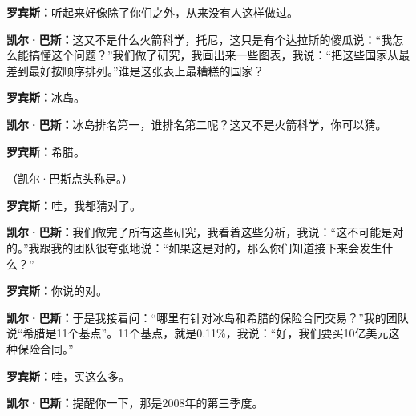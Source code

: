 \begin{BookQuote}
\textbf{罗宾斯：}听起来好像除了你们之外，从来没有人这样做过。
\end{BookQuote}

\begin{BookQuote}
\textbf{凯尔·巴斯：}这又不是什么火箭科学，托尼，这只是有个达拉斯的傻瓜说：“我怎么能搞懂这个问题？”我们做了研究，我画出来一些图表，我说：“把这些国家从最差到最好按顺序排列。”谁是这张表上最糟糕的国家？
\end{BookQuote}

\begin{BookQuote}
\textbf{罗宾斯：}冰岛。
\end{BookQuote}

\begin{BookQuote}
\textbf{凯尔·巴斯：}冰岛排名第一，谁排名第二呢？这又不是火箭科学，你可以猜。
\end{BookQuote}

\begin{BookQuote}
\textbf{罗宾斯：}希腊。
\end{BookQuote}

（凯尔·巴斯点头称是。）

\begin{BookQuote}
\textbf{罗宾斯：}哇，我都猜对了。
\end{BookQuote}

\begin{BookQuote}
\textbf{凯尔·巴斯：}我们做完了所有这些研究，我看着这些分析，我说：“这不可能是对的。”我跟我的团队很夸张地说：“如果这是对的，那么你们知道接下来会发生什么？”
\end{BookQuote}

\begin{BookQuote}
\textbf{罗宾斯：}你说的对。
\end{BookQuote}

\begin{BookQuote}
\textbf{凯尔·巴斯：}于是我接着问：“哪里有针对冰岛和希腊的保险合同交易？”我的团队说“希腊是11个基点”。11个基点，就是0.11\%，我说：“好，我们要买10亿美元这种保险合同。”
\end{BookQuote}

\begin{BookQuote}
\textbf{罗宾斯：}哇，买这么多。
\end{BookQuote}

\begin{BookQuote}
\textbf{凯尔·巴斯：}提醒你一下，那是2008年的第三季度。
\end{BookQuote}

